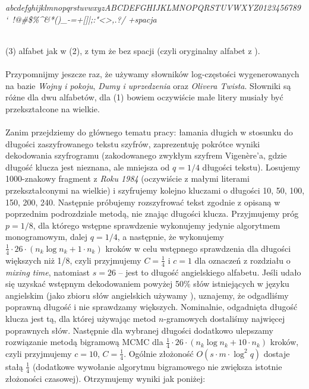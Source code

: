 \documentclass[a4paper]{article}
\theoremstyle{defn}
\theoremstyle{theorem}
\theoremstyle{lemma}
\theoremstyle{cor}
\theoremstyle{fact}
\begin{document}
\begin{center}
\textit{abcdefghijklmnopqrstuvwxyzABCDEFGHIJKLMNOPQRSTUVWXYZ0123456789\\
`~!@#\$\%\^&*()\_-=+{}[]|;:"<>,.?/ +spacja }\\\\
\end{center}
(3) alfabet jak w (2), z tym że bez spacji (czyli oryginalny alfabet z \cite{alphaqwerty}). \\\\
Przypomnijmy jeszcze raz, że używamy słowników log-częstości wygenerowanych na bazie \textit{Wojny i pokoju}, \textit{Dumy i uprzedzenia} oraz \textit{Olivera Twista}. Słowniki są różne dla dwu alfabetów, dla (1) bowiem oczywiście małe litery musiały być przekształcone na wielkie.\\\\
Zanim przejdziemy do głównego tematu pracy: łamania długich w stosunku do długości zaszyfrowanego tekstu szyfrów, zaprezentuję pokrótce wyniki dekodowania szyfrogramu (zakodowanego zwykłym szyfrem Vigenère'a, gdzie długość klucza jest nieznana, ale mniejsza od $q=1/4$ długości tekstu). Losujemy 1000-znakowy fragment z \textit{Roku 1984} (oczywiście z małymi literami przekształconymi na wielkie) i szyfrujemy kolejno kluczami o długości 10, 50, 100, 150, 200, 240. Następnie próbujemy rozszyfrować tekst zgodnie z opisaną w poprzednim podrozdziale metodą, nie znając długości klucza. Przyjmujemy próg $p=1/8$, dla którego wstępne sprawdzenie wykonujemy jedynie algorytmem monogramowym, dalej $q=1/4$, a następnie, że wykonujemy $\frac{1}{4} \cdot 26\cdot (n_k \log n_k + 1\cdot n_k)$ kroków w celu wstępnego sprawdzenia dla długości większych niż 1/8, czyli przyjmujemy $C=\frac{1}{4}$ i $c=1$ dla oznaczeń z rozdziału o \textit{mixing time}, natomiast $s=26$ – jest to długość angielskiego alfabetu. Jeśli udało się uzyskać wstępnym dekodowaniem powyżej 50\% słów istniejących w języku angielskim (jako zbioru słów angielskich używamy \cite{scrabble}), uznajemy, że odgadliśmy poprawną długość i nie sprawdzamy większych. Nominalnie, odgadnięta długość klucza jest tą, dla której używając metod $n$-gramowych dostaliśmy najwięcej poprawnych słów. Następnie dla wybranej długości dodatkowo ulepszamy rozwiązanie metodą bigramową MCMC dla $\frac{1}{4} \cdot 26\cdot (n_k \log n_k + 10\cdot n_k)$ kroków, czyli przyjmujemy $c=10$, $C=\frac{1}{4}$. Ogólnie złożoność $O(s \cdot m \cdot \log^2 q)$ dostaje stałą $\frac{1}{4}$ (dodatkowe wywołanie algorytmu bigramowego nie zwiększa istotnie złożoności czasowej).  Otrzymujemy wyniki jak poniżej:
\end{document}

